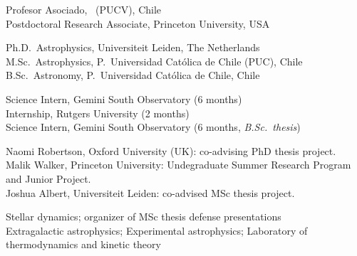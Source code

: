 \documentclass[11pt]{article}
\begin{document}

\noindent
{} Profesor Asociado, \pucv\ (PUCV), Chile\\
 Postdoctoral Research Associate, Princeton University, USA



\noindent
{} Ph.D.~Astrophysics, Universiteit Leiden, The Netherlands\\
 M.Sc.~Astrophysics, P.~Universidad Cat\'olica de Chile (PUC), Chile\\
 B.Sc.~Astronomy, P.~Universidad Cat\'olica de Chile, Chile



\noindent
{} Science Intern, Gemini South Observatory (6 months)\\
 Internship, Rutgers University (2 months)\\
 Science Intern, Gemini South Observatory (6 months, \emph{B.Sc.\ thesis})\\




\noindent
{} Naomi Robertson, Oxford University (UK): co-advising PhD thesis project.\\
 Malik Walker, Princeton University: Undegraduate Summer Research Program and Junior Project.\\
 Joshua Albert, Universiteit Leiden: co-advised MSc thesis project. 


\noindent
{} Stellar dynamics; organizer of MSc thesis defense presentations\\
 Extragalactic astrophysics; Experimental astrophysics; Laboratory of thermodynamics and kinetic theory\\
\end{document}
